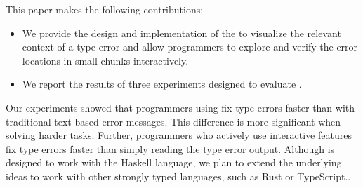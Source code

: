 This paper makes the following contributions:
\begin{itemize}
\item We provide the design and implementation of the \chameleon{} to visualize the relevant context of a type error and allow programmers to explore and verify the error locations in small chunks interactively.  
\item {
    We report the results of three experiments designed to evaluate \chameleon{}.}
\end{itemize}

Our experiments showed that programmers using \chameleon{} fix type errors faster than with traditional text-based error messages. This difference is more significant when solving harder tasks. Further, programmers who actively use \chameleon{} interactive features fix type errors faster than simply reading the type error output. Although \chameleon{} is designed to work with
the Haskell language, we plan to extend the underlying ideas to work with other strongly typed languages, such as Rust or TypeScript..